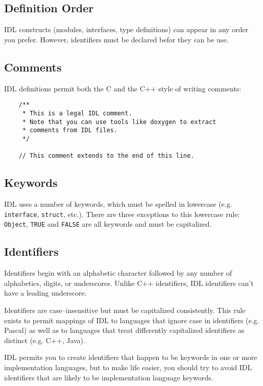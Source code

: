 \subsection{Definition Order}
IDL constructs (modules, interfaces, type definitions) can appear in any order
you prefer.
However, identifiers must be declared befor they can be use.


\subsection{Comments}
IDL definitions permit both the C and the C++ style of writing comments:
\begin{verbatim}
    /**
     * This is a legal IDL comment.
     * Note that you can use tools like doxygen to extract
     * comments from IDL files.
     */

    // This comment extends to the end of this line.
\end{verbatim}


\subsection{Keywords}
IDL uses a number of keywords, which must be spelled in lowercase (e.g. {\tt
interface}, {\tt struct}, etc.).
There are three exceptions to this lowercase rule: {\tt Object}, {\tt TRUE} and
{\tt FALSE} are all keywords and must be capitalized.

\subsection{Identifiers}
Identifiers begin with an alphabetic character followed by any number of
alphabetics, digits, or underscores. Unlike C++ identifiers, IDL identifiers
can't have a leading underscore.

Identifiers are case--insensitive but must be capitalized consistently. 
This rule exists to permit mappings of IDL to languages that ignore case in
identifiers (e.g. Pascal) as well as to languages that treat differently
capitalized identifiers as distinct (e.g. C++, Java).

IDL permits you to create identifiers that happen to be keywords in one or more
implementation languages, but to make life easier, you should try to avoid IDL
identifiers that are likely to be implementation language keywords.

\newpage
